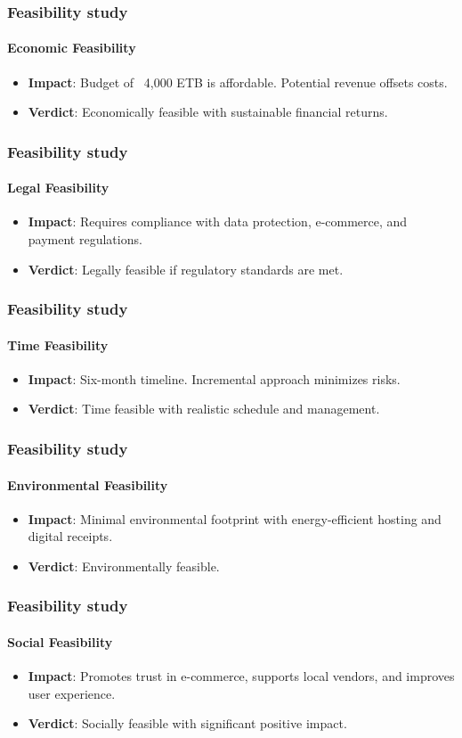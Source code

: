 \documentclass{beamer}
\begin{document}
\begin{frame}
	\frametitle{Feasibility study}
	\framesubtitle{Economic Feasibility}
	\begin{itemize}
		\item \textbf{Impact}: Budget of ~4,000 ETB is affordable. Potential revenue offsets costs.
		\item \textbf{Verdict}: Economically feasible with sustainable financial returns.
	\end{itemize}
\end{frame}

\begin{frame}
	\frametitle{Feasibility study}
	\framesubtitle{Legal Feasibility }
	\begin{itemize}
		\item\textbf{Impact}: Requires compliance with data protection, e-commerce, and payment regulations.
		\item\textbf{Verdict}: Legally feasible if regulatory standards are met.
	\end{itemize}
\end{frame}

\begin{frame}
	\frametitle{Feasibility study}
	\framesubtitle{Time Feasibility}
	\begin{itemize}
		\item\textbf{Impact}: Six-month timeline. Incremental approach minimizes risks.
		\item\textbf{Verdict}: Time feasible with realistic schedule and management.
	\end{itemize}
\end{frame}

\begin{frame}
	\frametitle{Feasibility study}
	\framesubtitle{Environmental Feasibility}
	\begin{itemize}
		\item\textbf{Impact}: Minimal environmental footprint with energy-efficient hosting and digital receipts.
		\item\textbf{Verdict}: Environmentally feasible.
	\end{itemize}
\end{frame}

\begin{frame}
	\frametitle{Feasibility study}
	\framesubtitle{Social Feasibility}
	\begin{itemize}
		\item\textbf{Impact}: Promotes trust in e-commerce, supports local vendors, and improves user experience.
		\item\textbf{Verdict}: Socially feasible with significant positive impact.
	\end{itemize}
\end{frame}
\end{document}
